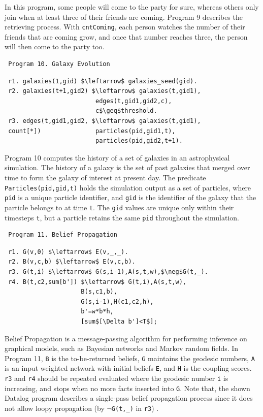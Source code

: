 \begin{appendix}
 In this program, some people will come to the party for sure, whereas others only join when at least three of their friends are coming. Program 9 \cite{7113340} describes the retrieving process. With \texttt{cntComing}, each person watches the number of their friends that are coming grow, and once that number reaches three, the person will then come to the party too.
 
 \begin{verbatim}
 Program 10. Galaxy Evolution
 \end{verbatim}\small
 \begin{lstlisting}
 r1. galaxies(1,gid) $\leftarrow$ galaxies_seed(gid).
 r2. galaxies(t+1,gid2) $\leftarrow$ galaxies(t,gid1),
                         edges(t,gid1,gid2,c),
                         c$\geq$threshold.
 r3. edges(t,gid1,gid2, $\leftarrow$ galaxies(t,gid1),
 count[*])               particles(pid,gid1,t),
                         particles(pid,gid2,t+1).
 \end{lstlisting}
 \normalsize
 
 Program 10 \cite{Wang:2015:AFR:2824032.2824052} computes the history of a set of galaxies in an astrophysical simulation. The history of a galaxy is the set of past galaxies that merged over time to form the galaxy of interest at present day. The predicate \texttt{Particles(pid,gid,t)} holds the simulation output as a set of particles, where \texttt{pid} is a unique particle identifier, and \texttt{gid} is the identifier of the galaxy that the particle belongs to at time \texttt{t}. The \texttt{gid} values are unique only within their timesteps \texttt{t}, but a particle retains the same \texttt{pid} throughout the simulation.
 
 
 \begin{verbatim}
 Program 11. Belief Propagation
 \end{verbatim}\small
 \begin{lstlisting}
 r1. G(v,0) $\leftarrow$ E(v,_,_).
 r2. B(v,c,b) $\leftarrow$ E(v,c,b).
 r3. G(t,i) $\leftarrow$ G(s,i-1),A(s,t,w),$\neg$G(t,_).
 r4. B(t,c2,sum[b']) $\leftarrow$ G(t,i),A(s,t,w),
                     B(s,c1,b),
                     G(s,i-1),H(c1,c2,h),
                     b'=w*b*h,
                     [sum$[\Delta b']<T$];
 \end{lstlisting}
 \normalsize
 
 Belief Propagation \cite{910572} is a message-passing algorithm for performing inference on graphical models, such as Bayesian networks and Markov random fields. In Program 11, \texttt{B} is the to-be-returned beliefs, \texttt{G} maintains the geodesic numbers, \texttt{A} is an input weighted network with initial beliefs \texttt{E}, and \texttt{H} is the coupling scores. \texttt{r3} and \texttt{r4} should be repeated evaluated where the geodesic number \texttt{i} is increasing, and stops when no more facts inserted into \texttt{G}. Note that, the shown Datalog program describes a single-pass belief propagation process since it does not allow loopy propagation (by $\neg$\texttt{G(t,\_)} in \texttt{r3}) \cite{Gatterbauer:2015:LSB:2735479.2735490}.
 

\end{appendix}
